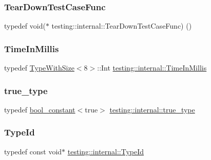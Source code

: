 \subsubsection{\texorpdfstring{Tear\+Down\+Test\+Case\+Func}{TearDownTestCaseFunc}}
{\footnotesize\ttfamily typedef void($\ast$ testing\+::internal\+::\+Tear\+Down\+Test\+Case\+Func) ()}

\mbox{\label{namespacetesting_1_1internal_a66a845df404b38fe85c5e14a069f255a}} 
\subsubsection{\texorpdfstring{Time\+In\+Millis}{TimeInMillis}}
{\footnotesize\ttfamily typedef \hyperlink{classtesting_1_1internal_1_1_type_with_size}{Type\+With\+Size}$<$8$>$\+::Int \hyperlink{namespacetesting_1_1internal_a66a845df404b38fe85c5e14a069f255a}{testing\+::internal\+::\+Time\+In\+Millis}}

\mbox{\label{namespacetesting_1_1internal_a62f917c3424d8841de9b49b5ec28edb4}} 
\subsubsection{\texorpdfstring{true\+\_\+type}{true\_type}}
{\footnotesize\ttfamily typedef \hyperlink{structtesting_1_1internal_1_1bool__constant}{bool\+\_\+constant}$<$true$>$ \hyperlink{namespacetesting_1_1internal_a62f917c3424d8841de9b49b5ec28edb4}{testing\+::internal\+::true\+\_\+type}}

\mbox{\label{namespacetesting_1_1internal_ab1114197d3c657d8b7f8e0c5caa12d00}} 
\subsubsection{\texorpdfstring{Type\+Id}{TypeId}}
{\footnotesize\ttfamily typedef const void$\ast$ \hyperlink{namespacetesting_1_1internal_ab1114197d3c657d8b7f8e0c5caa12d00}{testing\+::internal\+::\+Type\+Id}}


